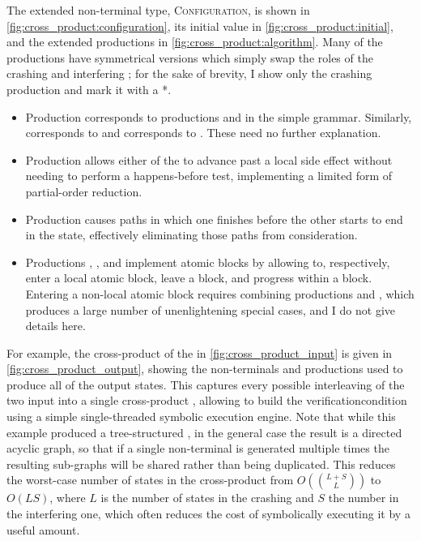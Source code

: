 The extended non-terminal type, \textsc{Configuration}, is shown in
\autoref{fig:cross_product:configuration}, its initial value in
\autoref{fig:cross_product:initial}, and the extended productions in
\autoref{fig:cross_product:algorithm}.  Many of the productions have
symmetrical versions which simply swap the roles of the crashing and
interfering {\StateMachines}; for the sake of brevity, I show only the
crashing {\StateMachine} production and mark it with a *.

\begin{itemize}
\item Production  corresponds to productions 
  and  in the simple grammar.  Similarly, 
  corresponds to  and  corresponds to
  .  These need no further explanation.
\item Production  allows either of the {\StateMachines}
  to advance past a local side effect without needing to perform a
  happens-before test, implementing a limited form of partial-order
  reduction.
\item Production  causes paths in which one
  {\StateMachine} finishes before the other starts to end in the
  {\stUnreached} state, effectively eliminating those paths from
  consideration.
\item Productions , , and 
  implement atomic blocks by allowing {\StateMachines} to,
  respectively, enter a local atomic block, leave a block, and
  progress within a block.  Entering a non-local atomic block requires
  combining productions  and , which
  produces a large number of unenlightening special cases, and I do
  not give details here.
\end{itemize}
For example, the cross-product of the {\StateMachines} in
\autoref{fig:cross_product_input} is given in
\autoref{fig:cross_product_output}, showing the non-terminals and
productions used to produce all of the output states.  This captures
every possible interleaving of the two input {\StateMachines} into a
single cross-product {\StateMachine}, allowing {\technique} to build
the \gls{verificationcondition} using a simple single-threaded
symbolic execution engine.  Note that while this example produced a
tree-structured {\StateMachine}, in the general case the result is a
directed acyclic graph, so that if a single non-terminal is generated
multiple times the resulting sub-graphs will be shared rather than
being duplicated.  This reduces the worst-case number of states in the
cross-product {\StateMachine} from $O(\binom{L+S}{L})$ to $O(LS)$,
where $L$ is the number of states in the crashing {\StateMachine} and
$S$ the number in the interfering one, which often reduces the cost of
symbolically executing it by a useful amount.

